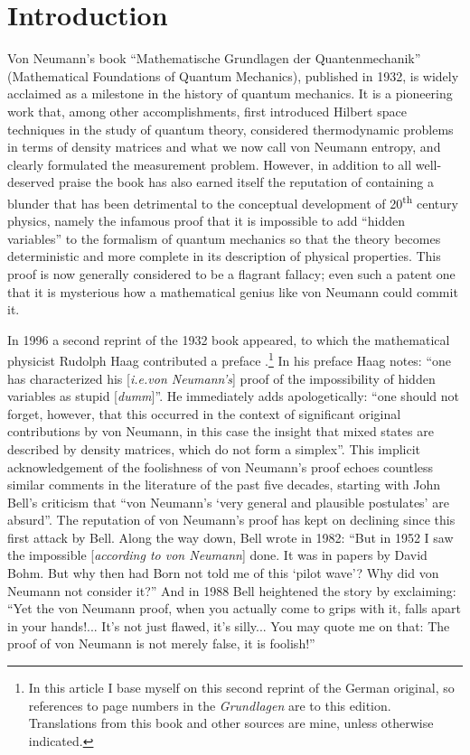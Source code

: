 \documentclass[11pt]{article}
\begin{document}
\section{Introduction}\label{intro}

Von Neumann's book ``Mathematische Grundlagen der Quantenmechanik''  (Mathematical Foundations of Quantum Mechanics)\cite{VN1}, published in 1932, is widely acclaimed as a milestone in the history of quantum mechanics. It is a pioneering work that, among other accomplishments, first introduced Hilbert space techniques in the study of quantum theory, considered thermodynamic problems in terms of density matrices and what we now call von Neumann entropy, and clearly formulated the measurement problem. However, in addition to all well-deserved praise the book has also earned itself the reputation of containing a blunder that has been detrimental to the conceptual development of 20\textsuperscript{th} century physics, namely the infamous proof that it is impossible to add ``hidden variables'' to the formalism of quantum mechanics so that the theory becomes deterministic and more complete in its description of physical properties. This proof is now generally considered to be a flagrant fallacy; even such a patent one that it is mysterious how a mathematical genius like von Neumann could commit it.

In 1996 a second reprint of the 1932 book appeared, to which the mathematical physicist Rudolph Haag contributed a preface \cite{VN1}.\footnote{In this article I base myself on this second reprint of the German original, so references to page numbers in the \emph{Grundlagen} are to this edition. Translations from this book and other sources are mine, unless otherwise indicated.} In his preface Haag notes: ``one has characterized his [\emph{i.e.\@ von Neumann's}] proof of the impossibility of hidden variables as stupid [\emph{dumm}]''. He immediately adds apologetically: ``one should not forget, however, that this occurred in the context of significant original contributions by von Neumann, in this case the insight that mixed states are described by density matrices, which do not form a simplex''. This implicit acknowledgement of the foolishness of von Neumann's proof echoes countless similar comments in the literature of the past five decades, starting with John Bell's criticism \cite{bell66} that ``von Neumann's `very general and plausible postulates' are absurd''.  The reputation of von Neumann's proof has kept on declining since this first attack by Bell. Along the way down, Bell \cite{bell82} wrote in 1982: ``But in 1952 I saw the impossible [\emph{according to von Neumann}] done. It was in papers by David Bohm. But why then had Born not told me of this `pilot wave'? Why did von Neumann not consider it?''  And in 1988 Bell \cite{bell88} heightened the story by exclaiming: ``Yet the von Neumann proof, when you actually come to grips with it, falls apart in your hands!... It's not just flawed, it's silly... You may quote me on that: The proof of von Neumann is not merely false, it is foolish!''
\end{document}
